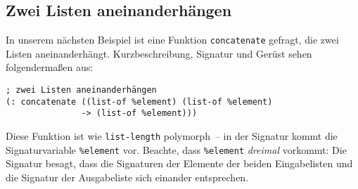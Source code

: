 \subsection{Zwei Listen aneinanderhängen}
\label{sec:concatenate}
In unserem nächsten Beispiel ist eine Funktion
\lstinline{concatenate} gefragt, die zwei
Listen aneinanderhängt.
% 
%
Kurzbeschreibung, Signatur und Gerüst sehen folgendermaßen aus:
%
\begin{lstlisting}
; zwei Listen aneinanderhängen
(: concatenate ((list-of %element) (list-of %element) 
               -> (list-of %element)))
\end{lstlisting}
%
Diese Funktion ist wie \lstinline{list-length} polymorph~-- in der
Signatur kommt die Signaturvariable \lstinline{%element} vor.
Beachte, dass \lstinline{%element} \emph{dreimal} vorkommt: Die
Signatur besagt, dass die Signaturen der Elemente der beiden
Eingabelisten und die Signatur der Ausgabeliste sich einander entsprechen.

